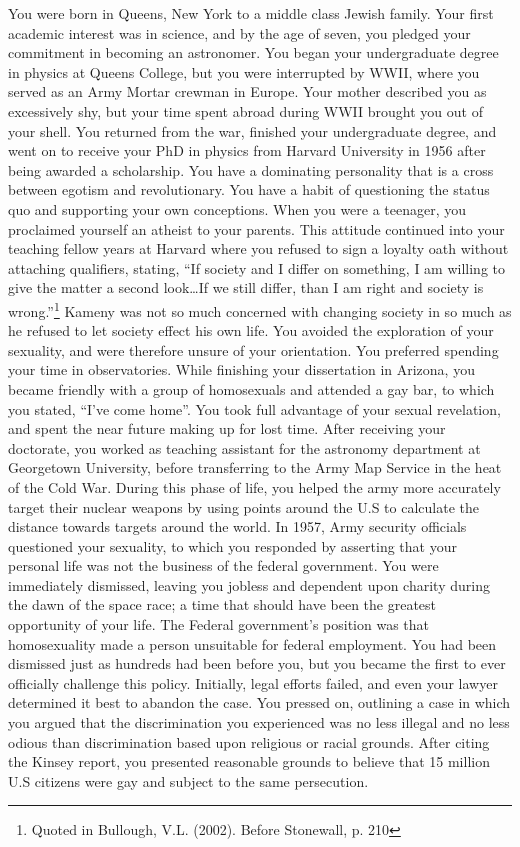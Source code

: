 You were born in Queens, New York to a middle class Jewish family. Your first academic interest was in science, and by the age of seven, you pledged your commitment in becoming an astronomer. You began your undergraduate degree in physics at Queens College, but you were interrupted by WWII, where you served as an Army Mortar crewman in Europe. Your mother described you as excessively shy, but your time spent abroad during WWII brought you out of your shell. You returned from the war, finished your undergraduate degree, and went on to receive your PhD in physics from Harvard University in 1956 after being awarded a scholarship.
You have a dominating personality that is a cross between egotism and revolutionary. You have a habit of questioning the status quo and supporting your own conceptions. When you were a teenager, you proclaimed yourself an atheist to your parents. This attitude continued into your teaching fellow years at Harvard where you refused to sign a loyalty oath without attaching qualifiers, stating, “If society and I differ on something, I am willing to give the matter a second look…If we still differ, than I am right and society is wrong.”\footnote{Quoted in Bullough, V.L. (2002). Before Stonewall, p. 210}
Kameny was not so much concerned with changing society in so much as he refused to let society effect his own life. You avoided the exploration of your sexuality, and were therefore unsure of your orientation. You preferred spending your time in observatories. While finishing your dissertation in Arizona, you became friendly with a group of homosexuals and attended a gay bar, to which you stated, “I’ve come home”. You took full advantage of your sexual revelation, and spent the near future making up for lost time.
After receiving your doctorate, you worked as teaching assistant for the astronomy department at Georgetown University, before transferring to the Army Map Service in the heat of the Cold War. During this phase of life, you helped the army more accurately target their nuclear weapons by using points around the U.S to calculate the distance towards targets around the world. In 1957, Army security officials questioned your sexuality, to which you responded by asserting that your personal life was not the business of the federal government. You were immediately dismissed, leaving you jobless and dependent upon charity during the dawn of the space race; a time that should have been the greatest opportunity of your life. The Federal government’s position was that homosexuality made a person unsuitable for federal employment. You had been dismissed just as hundreds had been before you, but you became the first to ever officially challenge this policy. Initially, legal efforts failed, and even your lawyer determined it best to abandon the case. You pressed on, outlining a case in which you argued that the discrimination you experienced was no less illegal and no less odious than discrimination based upon religious or racial grounds. After citing the Kinsey report, you presented reasonable grounds to believe that 15 million U.S citizens were gay and subject to the same persecution.
